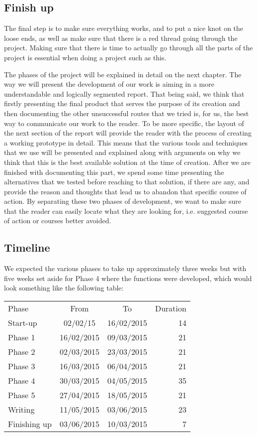\subsection{Finish up}
The final step is to make sure everything works, and to put a nice knot on the loose ends, as well as make sure that there is a red thread going through the project. Making sure that there is time to actually go through all the parts of the project is essential when doing a project such as this. 

The phases of the project will be explained in detail on the next chapter. The way we will present the development of our work is aiming in a more understandable and logically segmented report. That being said, we think that firstly presenting the final product that serves the purpose of its creation and then documenting the other unsuccessful routes that we tried is, for us, the best way to communicate our work to the reader. To be more specific, the layout of the next section of the report will provide the reader with the process of creating a working prototype in detail. This means that the various tools and techniques that we use will be presented and explained along with arguments on why we think that this is the best available solution at the time of creation. After we are finished with documenting this part, we spend some time presenting the alternatives that we tested before reaching to that solution, if there are any, and provide the reason and thoughts that lead us to abandon that specific course of action. By separating these two phases of development, we want to make sure that the reader can easily locate what they are looking for, i.e. suggested course of action or courses better avoided. 

\subsection{Timeline}
We expected the various phases to take up approximately three weeks but with five weeks set aside for Phase 4 where the functions were developed, which would look something like the following table:\\

\begin{tabular}{l | c | c | r}
Phase & From & To & Duration \\

Start-up & 02/02/15 & 16/02/2015 & 14 \\
Phase 1 & 16/02/2015 & 09/03/2015 & 21 \\
Phase 2 & 02/03/2015 & 23/03/2015 & 21 \\
Phase 3 & 16/03/2015 & 06/04/2015 & 21 \\
Phase 4 & 30/03/2015 & 04/05/2015 & 35 \\
Phase 5 & 27/04/2015 & 18/05/2015 & 21 \\
Writing & 11/05/2015 & 03/06/2015 & 23 \\
Finishing up & 03/06/2015 & 10/03/2015 & 7

\end{tabular} \\

